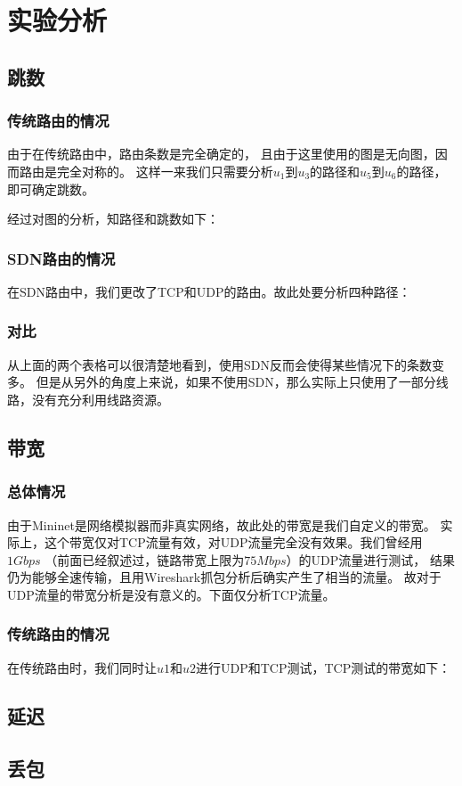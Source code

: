 \chapter{实验分析}
\label{cha:analyze}

\section{跳数}

\subsection{传统路由的情况}

由于在传统路由中，路由条数是完全确定的，
且由于这里使用的图是无向图，因而路由是完全对称的。
这样一来我们只需要分析$u_1$到$u_3$的路径和$u_5$到$u_6$的路径，
即可确定跳数。

经过对图的分析，知路径和跳数如下：



\subsection{SDN路由的情况}

在SDN路由中，我们更改了TCP和UDP的路由。故此处要分析四种路径：



\subsection{对比}

从上面的两个表格可以很清楚地看到，使用SDN反而会使得某些情况下的条数变多。
但是从另外的角度上来说，如果不使用SDN，那么实际上只使用了一部分线路，没有充分利用线路资源。

\section{带宽}

\subsection{总体情况}

由于Mininet是网络模拟器而非真实网络，故此处的带宽是我们自定义的带宽。
实际上，这个带宽仅对TCP流量有效，对UDP流量完全没有效果。我们曾经用$1Gbps$
（前面已经叙述过，链路带宽上限为$75Mbps$）的UDP流量进行测试，
结果仍为能够全速传输，且用Wireshark抓包分析后确实产生了相当的流量。
故对于UDP流量的带宽分析是没有意义的。下面仅分析TCP流量。

\subsection{传统路由的情况}

在传统路由时，我们同时让$u1$和$u2$进行UDP和TCP测试，TCP测试的带宽如下：



\section{延迟}

\section{丢包}

